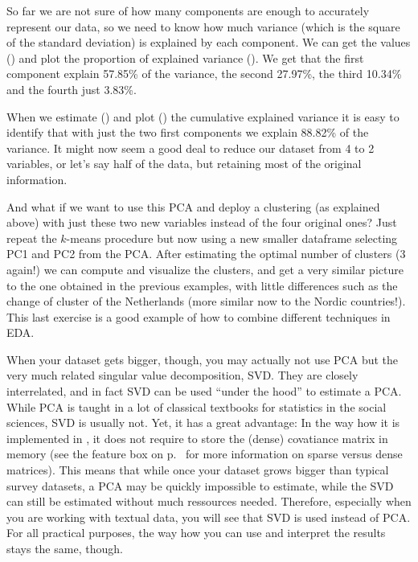 
So far we are not sure of how many components are enough to accurately represent our data, so we need to know how much variance (which is the square of the standard deviation) is explained by each component. We can get the values () and plot  the proportion of explained variance (). We get that the first component explain 57.85\% of the variance, the second 27.97\%, the third 10.34\% and the fourth just 3.83\%. 


When we estimate () and plot () the cumulative explained variance it is easy to identify that with just the two first components we explain 88.82\% of the variance. It might now seem a good deal to reduce our dataset from 4 to 2 variables, or let’s say half of the data, but retaining most of the original information.


And what if we want to use this PCA and deploy a clustering (as explained above) with just these two new variables instead of the four original ones?  Just repeat the $k$-means procedure but now using a new smaller dataframe selecting PC1 and PC2 from the PCA. After estimating the optimal number of clusters (3 again!) we can compute and visualize the clusters, and get a very similar picture to the one obtained in the previous examples, with little differences such as the change of cluster of the Netherlands (more similar now to the Nordic countries!). This last exercise is a good example of how to combine different techniques in EDA.


When your dataset gets bigger, though, you may actually not use PCA
but the very much related singular value decomposition, SVD. They are
closely interrelated, and in fact SVD can be used ``under the hood''
to estimate a PCA. While PCA is taught in a lot of classical textbooks
for statistics in the social sciences, SVD is usually not. Yet, it has
a great advantage: In the way how it is implemented in
, it does not require to store the (dense)
covatiance matrix in memory (see the feature box on
p.~\pageref{feature:sparse} for more information on sparse versus dense
matrices). This means that while once your dataset grows bigger than
typical survey datasets, a PCA may be quickly impossible to estimate,
while the SVD can still be estimated without much ressources
needed. Therefore, especially when you are working with textual data,
you will see that SVD is used instead of PCA. For all practical
purposes, the way how you can use and interpret the results stays the
same, though.
